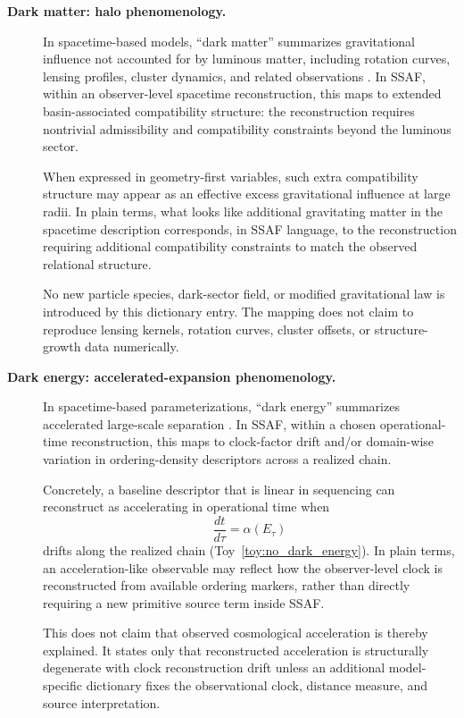 \documentclass[aps,prx,onecolumn,11pt]{revtex4-2}
\theoremstyle{plain}
\theoremstyle{definition}
\theoremstyle{remark}
\begin{document}
\begin{description}

\item[\textbf{Dark matter: halo phenomenology.}]
In spacetime-based models, ``dark matter'' summarizes gravitational
influence not accounted for by luminous matter, including rotation
curves, lensing profiles, cluster dynamics, and related observations
\cite{Clowe2006,Planck2018}. In SSAF, within an observer-level
spacetime reconstruction, this maps to extended basin-associated
compatibility structure: the reconstruction requires nontrivial
admissibility and compatibility constraints beyond the luminous sector.

When expressed in geometry-first variables, such extra compatibility
structure may appear as an effective excess gravitational influence at
large radii. In plain terms, what looks like additional gravitating
matter in the spacetime description corresponds, in SSAF language, to
the reconstruction requiring additional compatibility constraints to
match the observed relational structure.

No new particle species, dark-sector field, or modified gravitational
law is introduced by this dictionary entry. The mapping does not claim
to reproduce lensing kernels, rotation curves, cluster offsets, or
structure-growth data numerically.

\item[\textbf{Dark energy: accelerated-expansion phenomenology.}]
In spacetime-based parameterizations, ``dark energy'' summarizes
accelerated large-scale separation \cite{Planck2018}. In SSAF, within
a chosen operational-time reconstruction, this maps to clock-factor
drift and/or domain-wise variation in ordering-density descriptors
across a realized chain.

Concretely, a baseline descriptor that is linear in sequencing can
reconstruct as accelerating in operational time when
\[
\frac{dt}{d\tau}
=
\alpha(E_\tau)
\]
drifts along the realized chain
(Toy~\ref{toy:no_dark_energy}). In plain terms, an acceleration-like
observable may reflect how the observer-level clock is reconstructed
from available ordering markers, rather than directly requiring a new
primitive source term inside SSAF.

This does not claim that observed cosmological acceleration is thereby
explained. It states only that reconstructed acceleration is structurally
degenerate with clock reconstruction drift unless an additional
model-specific dictionary fixes the observational clock, distance
measure, and source interpretation.


\end{description}
\end{document}
